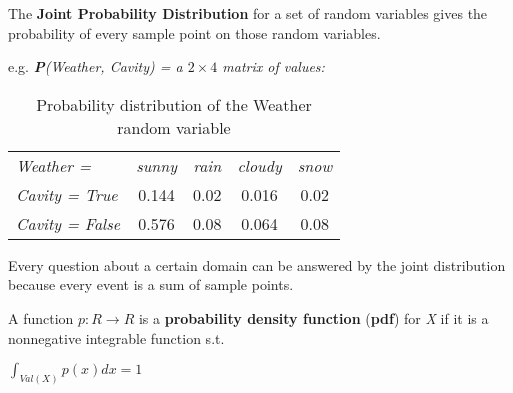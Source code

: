 \begin{definition}
    The \textbf{Joint Probability Distribution} for a set of random variables gives the probability of every sample point on those random variables. \vspace{3.5pt}

    e.g. \textit{\textbf{P}(Weather, Cavity) = a $2\times4$ matrix of values:}
    \begin{center}
        \begin{table}[H]
            \centering
            \begin{tabular}{|l|c|c|c|c|}
                \hline
                \it Weather = & \it sunny & \it rain & \it cloudy & \it snow \\
                \cline{1-5}
                \it Cavity = True & 0.144 & 0.02 & 0.016 & 0.02 \\
                \it Cavity = False & 0.576 & 0.08 & 0.064 & 0.08 \\
                \hline
            \end{tabular}
            \caption{Probability distribution of the Weather random variable}
            \label{t_1_1}
        \end{table}
    \end{center}
    Every question about a certain domain can be answered by the joint distribution because every event is a sum of sample points.
\end{definition}
\begin{definition}
    A function $p:R \rightarrow R$ is a \textbf{probability density function} (\textbf{pdf}) for \textit{X} if it is a nonnegative integrable function s.t. \vspace{3.5pt}

    \begin{center}
        $\int_{Val(X)} p(x)dx = 1$
    \end{center}
\end{definition}
